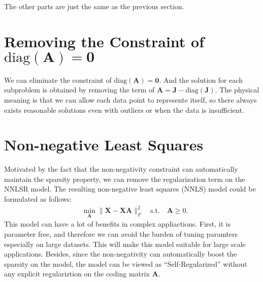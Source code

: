 \documentclass[10pt,twocolumn,letterpaper]{article}
\begin{document}
The other parts are just the same as the previous section.


\section{Removing the Constraint of $\text{diag}(\bm{A})=\bm{0}$}

We can eliminate the constraint of $\text{diag}(\bm{A})=\bm{0}$. And the solution for each subproblem is obtained by removing the term of $\bm{A}=\bm{J}-\text{diag}(\bm{J})$. The physical meaning is that we can allow each data point to represente itself, so there always exists reasonable solutions even with outliers or when the data is insufficient. 


\section{Non-negative Least Squares}

Motivated by the fact that the non-negativity constraint can automatically maintain the sparsity property, we can remove the regularization term on the NNLSR model. The resulting non-negative least squares (NNLS) model could be formulated as follows:
\begin{equation}
\begin{split}
\label{e21}
&
\min_{\bm{A}}
\|
\bm{X}
-
\bm{X}\bm{A}
\|_{F}^{2}
\quad 
\text{s.t.}
\quad
\bm{A}\ge0
.
\end{split}
\end{equation}
This model can have a lot of benefits in complex appliactions. First, it is parameter free, and therefore we can avoid the burden of tuning paramters especially on large datasets. This will make this model suitable for large scale applications. Besides, since the non-negativity can automatically boost the sparsity on the model, the model can be viewed as ``Self-Regularized'' without any explicit regulariztion on the coding matrix $\bm{A}$.
\end{document}
